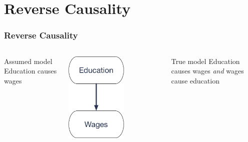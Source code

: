 \documentclass[12pt, block=fill]{beamer}
\begin{document}
\section{Reverse Causality}

\begin{frame}[t]
  \frametitle{Reverse Causality}
  
  \begin{columns}[t]
    \begin{block}{Assumed model}
      Education causes wages
    \end{block}
    \vspace{2em}
    \centering
    \includegraphics[width=0.6\textwidth]{images/education_assumed}
    \begin{block}{True model}
      Education causes wages \textit{and} wages cause education
    \end{block}
    \centering

\end{columns}
\end{frame}
\end{document}
